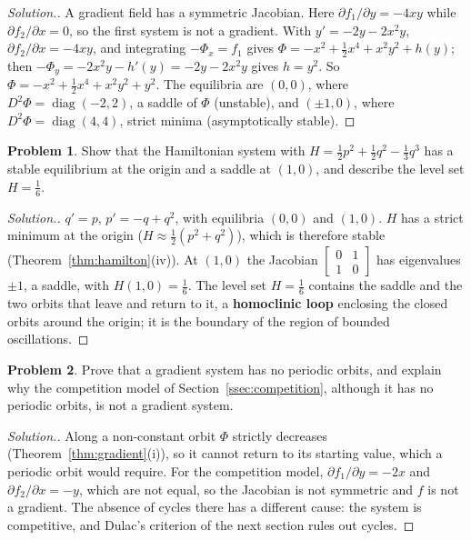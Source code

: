 \documentclass[11pt,a4paper]{article}
\numberwithin{equation}{section}
\theoremstyle{definition}
\newtheorem{problemx}{Problem}[subsection]
\newenvironment{problem}{\begin{problemx}}{\end{problemx}}
\newenvironment{solution}
  {\renewcommand{\qedsymbol}{}\begin{proof}[\textit{Solution}.]}
  {\end{proof}}
\begin{document}
\begin{solution}
A gradient field has a symmetric Jacobian. Here $\partial f_1/\partial y = -4xy$ while $\partial f_2/\partial x = 0$, so the first system is not a gradient. With $y' = -2y - 2x^2y$, $\partial f_2/\partial x = -4xy$, and
integrating $-\Phi_x = f_1$ gives $\Phi = -x^2 + \frac12x^4 + x^2y^2 + h(y)$; then $-\Phi_y = -2x^2y - h'(y) = -2y - 2x^2y$ gives $h = y^2$. So $\Phi = -x^2 + \frac12x^4 + x^2y^2 + y^2$. The equilibria are $(0, 0)$, where
$D^2\Phi = \operatorname{diag}(-2, 2)$, a saddle of $\Phi$ (unstable), and $(\pm1, 0)$, where $D^2\Phi = \operatorname{diag}(4, 4)$, strict minima (asymptotically stable).
\end{solution}

\begin{problem}
Show that the Hamiltonian system with $H = \frac12p^2 + \frac12q^2 - \frac13q^3$ has a stable equilibrium at the origin and a saddle at $(1, 0)$, and describe the level set $H = \frac16$.
\end{problem}

\begin{solution}
$q' = p$, $p' = -q + q^2$, with equilibria $(0, 0)$ and $(1, 0)$. $H$ has a strict minimum at the origin ($H \approx \frac12(p^2 + q^2)$), which is therefore stable (Theorem~\ref{thm:hamilton}(iv)). At $(1, 0)$ the Jacobian
$\begin{bmatrix} 0 & 1\\ 1 & 0\end{bmatrix}$ has eigenvalues $\pm1$, a saddle, with $H(1, 0) = \frac16$. The level set $H = \frac16$ contains the saddle and the two orbits that leave and return to it, a \textbf{homoclinic loop} enclosing
the closed orbits around the origin; it is the boundary of the region of bounded oscillations.
\end{solution}

\begin{problem}
Prove that a gradient system has no periodic orbits, and explain why the competition model of Section~\ref{ssec:competition}, although it has no periodic orbits, is not a gradient system.
\end{problem}

\begin{solution}
Along a non-constant orbit $\Phi$ strictly decreases (Theorem~\ref{thm:gradient}(i)), so it cannot return to its starting value, which a periodic orbit would require. For the competition model,
$\partial f_1/\partial y = -2x$ and $\partial f_2/\partial x = -y$, which are not equal, so the Jacobian is not symmetric and $f$ is not a gradient. The absence of cycles there has a different cause: the
system is competitive, and Dulac's criterion of the next section rules out cycles.
\end{solution}
\end{document}
